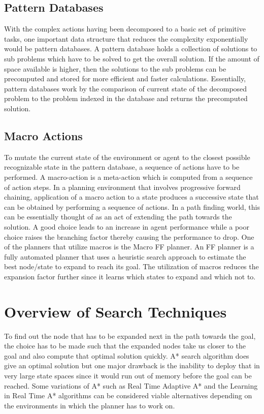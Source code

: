 \documentclass[tog]{acmsiggraph}
\begin{document}
\subsection{Pattern Databases}

With the complex actions having been decomposed to a basic set of
primitive tasks, one important data structure that reduces the
complexity exponentially would be pattern databases. A pattern
database holds a collection of solutions to sub problems which have to
be solved to get the overall solution. \cite{korf2002disjoint} If the amount of space
available is higher, then the solutions to the sub problems can be
precomputed and stored for more efficient and faster calculations.
Essentially, pattern databases work by the comparison of current state
of the decomposed problem to the problem indexed in the database and
returns the precomputed solution.

\subsection{Macro Actions}

To mutate the current state of the environment or agent to the closest
possible recognizable state in the pattern database, a sequence of
actions have to be performed. A macro-action is a meta-action which is
computed from a sequence of action steps. In a planning environment
that involves progressive forward chaining, application of a macro
action to a state produces a successive state that can be obtained by
performing a sequence of actions. In a path finding world, this can be
essentially thought of as an act of extending the path towards the
solution. A good choice leads to an increase in agent performance
while a poor choice raises the branching factor thereby causing the
performance to drop. One of the planners that utilize macros is the
Macro FF planner. \cite{botea2005macro} An FF planner is a fully automated planner that uses
a heuristic search approach to estimate the best node/state to expand
to reach its goal. The utilization of macros reduces the expansion
factor further since it learns which states to expand and which not
to.

\section{Overview of Search Techniques}

To find out the node that has to be expanded next in the path towards
the goal, the choice has to be made such that the expanded nodes take
us closer to the goal and also compute that optimal solution quickly.
A* search algorithm does give an optimal solution but one major
drawback is the inability to deploy that in very large state spaces
since it would run out of memory before the goal can be reached. Some
variations of A* such as Real Time Adaptive A* and the Learning in
Real Time A* algorithms can be considered viable alternatives
depending on the environments in which the planner has to work on.
\end{document}
